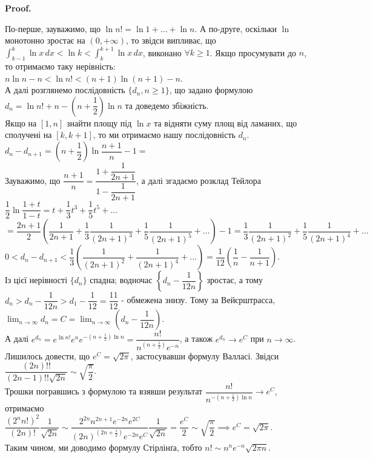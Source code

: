 \documentclass[a4paper, 10pt]{article}
\makeatletter
\def\huge{\displaystyle}
\def\qed{$\blacksquare$}
\theoremstyle{theoremdd}
\theoremstyle{theoremdd}
\theoremstyle{theoremdd}
\theoremstyle{theoremdd}
\theoremstyle{theoremdd}
\theoremstyle{theoremdd}
\theoremstyle{theoremdd}
\theoremstyle{theoremdd}
\theoremstyle{theoremdd}
\renewenvironment{proof}[1][Proof.\\]{\par
\pushQED{\hfill \qed}%
\normalfont \topsep6\p@\@plus6\p@\relax
\trivlist
\item\relax
{\bfseries
#1\@addpunct{.}}\hspace\labelsep\ignorespaces
}{%
\popQED\endtrivlist\@endpefalse
}
\makeatother
\begin{document}
\begin{proof}
По-перше, зауважимо, що $\ln n! = \ln 1 + \dots + \ln n$. А по-друге, оскільки $\ln$ монотонно зростає на $(0,+\infty)$, то звідси випливає, що\\
$\huge\int_{k-1}^k \ln x\,dx < \ln k < \int_k^{k+1} \ln x\,dx$, виконано $\forall k \geq 1$.
Якщо просумувати до $n$, то отримаємо таку нерівність:\\
$n \ln n - n < \ln n! < (n+1) \ln (n+1) - n$.\\
А далі розглянемо послідовність $\{ d_n, n \geq 1\}$, що задано формулою $d_n = \ln n! + n - \left( n + \dfrac{1}{2} \right) \ln n$ та доведемо збіжність.\\
Якщо на $[1,n]$ знайти площу під $\ln x$ та відняти суму площ від ламаних, що сполучені на $[k,k+1]$, то ми отримаємо нашу послідовність $d_n$.\\
$d_n - d_{n+1} = \left( n + \dfrac{1}{2} \right) \ln \dfrac{n+1}{n} - 1 \boxed{=}$\\
Зауважимо, що $\dfrac{n+1}{n} = \dfrac{1+\dfrac{1}{2n+1}}{1-\dfrac{1}{2n+1}}$, а далі згадаємо розклад Тейлора $\dfrac{1}{2} \ln \dfrac{1+t}{1-t} = t + \dfrac{1}{3}t^3 + \dfrac{1}{5}t^5 + \dots$\\
$= \dfrac{2n+1}{2} \left( \dfrac{1}{2n+1} + \dfrac{1}{3} \dfrac{1}{(2n+1)^3} + \dfrac{1}{5} \dfrac{1}{(2n+1)^5} + \dots \right) - 1 = \dfrac{1}{3} \dfrac{1}{(2n+1)^2} + \dfrac{1}{5} \dfrac{1}{(2n+1)^4} + \dots$\\
$0 < d_n - d_{n+1} < \dfrac{1}{3} \left( \dfrac{1}{(2n+1)^2} + \dfrac{1}{(2n+1)^4} + \dots \right) = \dfrac{1}{12} \left( \dfrac{1}{n} - \dfrac{1}{n+1} \right)$.\\
Із цієї нерівності $\{d_n \}$ спадна; водночас $\left \{ d_n - \dfrac{1}{12n} \right\}$ зростає, а тому $d_n > d_n - \dfrac{1}{12n} > d_1 - \dfrac{1}{12} = \dfrac{11}{12}$ - обмежена знизу. Тому за Вейєрштрасса, $\huge\lim_{n \to \infty} d_n = C = \lim_{n \to \infty} \left( d_n - \dfrac{1}{12n} \right)$.\\
А далі $e^{d_n} = e^{\ln n!} e^n e^{-\left( n + \frac{1}{2} \right) \ln n} = \dfrac{n!}{n^{\left( n + \frac{1}{2} \right)} e^{-n}}$, а також $e^{d_n} \to e^C$ при $n \to \infty$.\\
Лишилось довести, що $e^C = \sqrt{2 \pi}$, застосувавши формулу Валласі. Звідси $\dfrac{(2n)!!}{(2n-1)!! \sqrt{2n}} \sim \sqrt{\dfrac{\pi}{2}}$.\\
Трошки погравшись з формулою та взявши результат $\dfrac{n!}{n^{-\left( n + \frac{1}{2} \right) \ln n}} \to e^C$, отримаємо \\ $\dfrac{(2^n n!)^2}{(2n)!} \dfrac{1}{\sqrt{2n}} \sim \dfrac{2^{2n} n^{2n+1} e^{-2n} e^{2C}}{(2n)^{\left(2n+ \frac{1}{2} \right)} e^{-2n} e^C} \dfrac{1}{\sqrt{2n}} = \dfrac{e^C}{2} \sim \sqrt{\dfrac{\pi}{2}} \implies e^C = \sqrt{2\pi}$.\\
Таким чином, ми доводимо формулу Стірлінґа, тобто $n! \sim n^n e^{-n} \sqrt{2\pi n}$.
\end{proof}
\fi
\newpage
\end{document}
